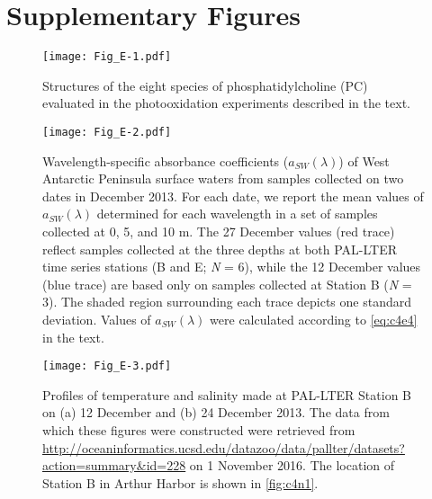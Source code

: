 \clearpage

\section{Supplementary Figures}

\begin{figure}[!th]
\centering
\texttt{[image: Fig\_E-1.pdf]}
\caption[Structures of the eight species of phosphatidylcholine evaluated in photooxidation experiments]{Structures of the eight species of phosphatidylcholine (PC) evaluated in the photooxidation experiments described in the text.}
\label{fig:aen1}
\end{figure}

\clearpage

\begin{figure}[!th]
\centering
\texttt{[image: Fig\_E-2.pdf]}
\caption[Wavelength-specific absorbance coefficients of West Antarctic Peninsula surface waters]{Wavelength-specific absorbance coefficients (${a_{SW}}(\lambda )$) of West Antarctic Peninsula surface waters from samples collected on two dates in December 2013. For each date, we report the mean values of ${a_{SW}}(\lambda )$ determined for each wavelength in a set of samples collected at 0, 5, and 10 m. The 27 December values (red trace) reflect samples collected at the three depths at both PAL-LTER time series stations (B and E; \emph{N} = 6), while the 12 December values (blue trace) are based only on samples collected at Station B (\emph{N} = 3). The shaded region surrounding each trace depicts one standard deviation. Values of ${a_{SW}}(\lambda )$ were calculated according to \autoref{eq:c4e4} in the text.}
\label{fig:aen2}
\end{figure}

\clearpage

\begin{figure}[!th]
\centering
\texttt{[image: Fig\_E-3.pdf]}
\caption[Profiles of temperature and salinity made at PAL-LTER Station B in December 2013]{Profiles of temperature and salinity made at PAL-LTER Station B on (a) 12 December and (b) 24 December 2013. The data from which these figures were constructed were retrieved from \url{http://oceaninformatics.ucsd.edu/datazoo/data/pallter/datasets?action=summary&id=228} on 1 November 2016. The location of Station B in Arthur Harbor is shown in \autoref{fig:c4n1}.}
\label{fig:aen3}
\end{figure}

